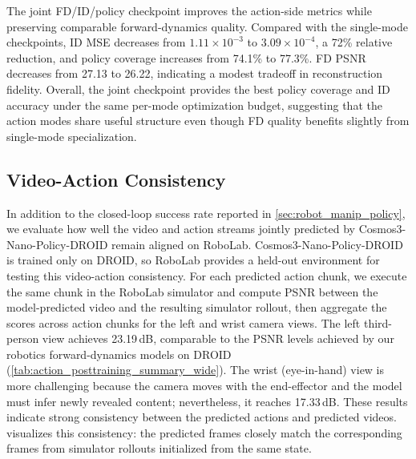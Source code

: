 

The joint FD/ID/policy checkpoint improves the action-side metrics while preserving comparable forward-dynamics quality.
Compared with the single-mode checkpoints, ID MSE decreases from $1.11 \times 10^{-3}$ to $3.09 \times 10^{-4}$, a 72\% relative reduction, and policy coverage increases from 74.1\% to 77.3\%.
FD PSNR decreases from 27.13 to 26.22, indicating a modest tradeoff in reconstruction fidelity.
Overall, the joint checkpoint provides the best policy coverage and ID accuracy under the same per-mode optimization budget, suggesting that the action modes share useful structure even though FD quality benefits slightly from single-mode specialization.

\FloatBarrier

\subsection{Video-Action Consistency}
\label{app:robolab_video_action_consistency}
In addition to the closed-loop success rate reported in \cref{sec:robot_manip_policy}, we evaluate how well the video and action streams jointly predicted by Cosmos3-Nano-Policy-DROID remain aligned on RoboLab. 
Cosmos3-Nano-Policy-DROID is trained only on DROID, so RoboLab provides a held-out environment for testing this video-action consistency.
For each predicted action chunk, we execute the same chunk in the RoboLab simulator and compute PSNR between the model-predicted video and the resulting simulator rollout, then aggregate the scores across action chunks for the left and wrist camera views.
The left third-person view achieves 23.19\,dB, comparable to the PSNR levels achieved by our robotics forward-dynamics models on DROID (\cref{tab:action_posttraining_summary_wide}).
The wrist (eye-in-hand) view is more challenging because the camera moves with the end-effector and the model must infer newly revealed content; nevertheless, it reaches 17.33\,dB. 
These results indicate strong consistency between the predicted actions and predicted videos.
 visualizes this consistency: the predicted frames closely match the corresponding frames from simulator rollouts initialized from the same state.


\FloatBarrier
